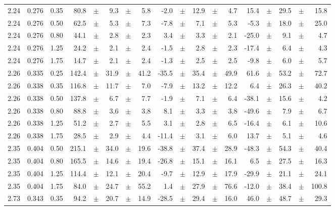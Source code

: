 \documentclass[prc,aps,floatfix,showpacs,showkeys,twocolumn,superscriptaddress,letterpaper,10pt]{revtex4-1}
\begin{document}
\begin{widetext}
\begin{longtable}{ccc@{\extracolsep{1cm}}d@{\extracolsep{0pt}}cdcd@{\extracolsep{1cm}}d@{\extracolsep{0pt}}cdcd@{\extracolsep{1cm}}d@{\extracolsep{0pt}}cdcd}
2.24 & 0.276 & 0.35 & 80.8 &	$\pm$ & 9.3 &	$\pm$ & 5.8 & -2.0 &	$\pm$ & 12.9 &	$\pm$ & 4.7 & 15.4 &	$\pm$ & 29.5 &	$\pm$ & 15.8\\
2.24 & 0.276 & 0.50 & 62.5 &	$\pm$ & 5.3 &	$\pm$ & 7.3 & -7.8 &	$\pm$ & 7.1 &	$\pm$ & 5.3 & -5.3 &	$\pm$ & 18.0 &	$\pm$ & 25.0\\
2.24 & 0.276 & 0.80 & 44.1 &	$\pm$ & 2.8 &	$\pm$ & 2.3 & 3.4 &	$\pm$ & 3.3 &	$\pm$ & 2.1 & -25.0 &	$\pm$ & 9.1 &	$\pm$ & 4.7\\
2.24 & 0.276 & 1.25 & 24.2 &	$\pm$ & 2.1 &	$\pm$ & 2.4 & -1.5 &	$\pm$ & 2.8 &	$\pm$ & 2.3 & -17.4 &	$\pm$ & 6.4 &	$\pm$ & 4.3\\
2.24 & 0.276 & 1.75 & 14.7 &	$\pm$ & 2.1 &	$\pm$ & 2.4 & -1.3 &	$\pm$ & 2.5 &	$\pm$ & 2.5 & -9.8 &	$\pm$ & 6.0 &	$\pm$ & 5.7\\
2.26 & 0.335 & 0.25 & 142.4 &	$\pm$ & 31.9 &	$\pm$ & 41.2 & -35.5 &	$\pm$ & 35.4 &	$\pm$ & 49.9 & 61.6 &	$\pm$ & 53.2 &	$\pm$ & 72.7\\
2.26 & 0.338 & 0.35 & 116.8 &	$\pm$ & 11.7 &	$\pm$ & 7.0 & -7.9 &	$\pm$ & 13.2 &	$\pm$ & 12.2 & 6.4 &	$\pm$ & 26.3 &	$\pm$ & 40.2\\
2.26 & 0.338 & 0.50 & 137.8 &	$\pm$ & 6.7 &	$\pm$ & 7.7 & -1.9 &	$\pm$ & 7.1 &	$\pm$ & 6.4 & -38.1 &	$\pm$ & 15.6 &	$\pm$ & 4.2\\
2.26 & 0.338 & 0.80 & 88.8 &	$\pm$ & 3.6 &	$\pm$ & 3.8 & 8.1 &	$\pm$ & 3.3 &	$\pm$ & 3.8 & -49.6 &	$\pm$ & 7.9 &	$\pm$ & 6.7\\
2.26 & 0.338 & 1.25 & 51.2 &	$\pm$ & 2.7 &	$\pm$ & 5.5 & 3.1 &	$\pm$ & 2.8 &	$\pm$ & 6.5 & -16.4 &	$\pm$ & 6.1 &	$\pm$ & 10.6\\
2.26 & 0.338 & 1.75 & 28.5 &	$\pm$ & 2.9 &	$\pm$ & 4.4 & -11.4 &	$\pm$ & 3.1 &	$\pm$ & 6.0 & 13.7 &	$\pm$ & 5.1 &	$\pm$ & 4.6\\
2.35 & 0.404 & 0.50 & 215.1 &	$\pm$ & 34.0 &	$\pm$ & 19.6 & -38.8 &	$\pm$ & 37.4 &	$\pm$ & 28.9 & -48.3 &	$\pm$ & 54.3 &	$\pm$ & 40.4\\
2.35 & 0.404 & 0.80 & 165.5 &	$\pm$ & 14.6 &	$\pm$ & 19.4 & -26.8 &	$\pm$ & 15.1 &	$\pm$ & 16.1 & 6.5 &	$\pm$ & 27.5 &	$\pm$ & 16.3\\
2.35 & 0.404 & 1.25 & 114.4 &	$\pm$ & 12.1 &	$\pm$ & 20.4 & -9.7 &	$\pm$ & 12.9 &	$\pm$ & 17.9 & -29.9 &	$\pm$ & 21.1 &	$\pm$ & 24.1\\
2.35 & 0.404 & 1.75 & 84.0 &	$\pm$ & 24.7 &	$\pm$ & 55.2 & 1.4 &	$\pm$ & 27.9 &	$\pm$ & 76.6 & -12.0 &	$\pm$ & 38.4 &	$\pm$ & 100.8\\
2.73 & 0.343 & 0.35 & 94.2 &	$\pm$ & 20.7 &	$\pm$ & 14.9 & -28.5 &	$\pm$ & 29.4 &	$\pm$ & 16.0 & 46.0 &	$\pm$ & 48.7 &	$\pm$ & 29.3\\

\end{longtable}
\end{widetext}
\end{document}
